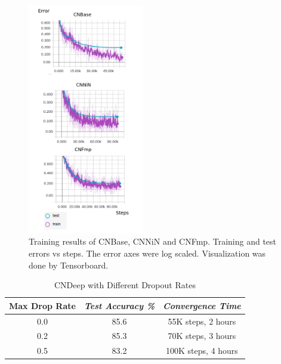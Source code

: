 \documentclass[conference]{IEEEtran}
\begin{document}
\begin{figure}[htbp]
\centerline{\includegraphics[width=0.45\textwidth]{result1.png}}
\caption{Training results of CNBase, CNNiN and CNFmp. Training and test errors vs steps. The error axes were log scaled. Visualization was done by Tensorboard.}
\label{fig3}
\end{figure}


\begin{table}[htbp]
\caption{CNDeep with Different Dropout Rates}
\begin{center}
\begin{tabular}{|c|c|c|}
\hline
\textbf{Max Drop Rate}& \textbf{\textit{Test Accuracy \%}}& \textbf{\textit{Convergence Time}} \\
\hline
0.0  & 85.6& 55K steps, 2 hours\\
\hline
0.2 & 85.3 & 70K steps, 3 hours \\
\hline
0.5 & 83.2& 100K steps, 4 hours \\
\hline
\end{tabular}
\label{tab2}
\end{center}
\end{table}
\end{document}
